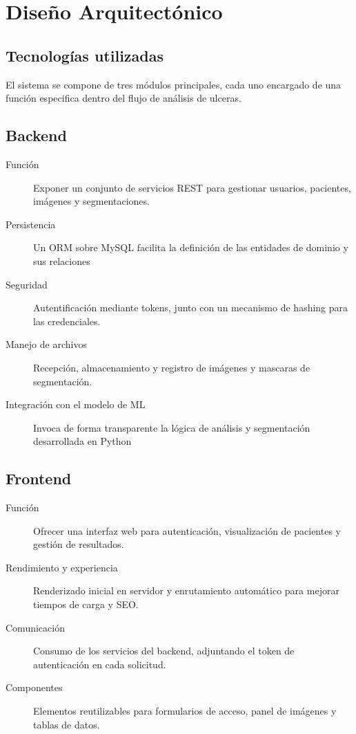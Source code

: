 \section{Diseño Arquitectónico}
\label{sc:DA}

\subsection{Tecnologías utilizadas}
\label{ssc:tech}

El sistema se compone de tres módulos principales, cada uno encargado de una función especifica dentro del flujo de análisis de ulceras.
\subsection{Backend}
\begin{description}
    \item[Función] Exponer un conjunto de servicios REST para gestionar usuarios, pacientes, imágenes y segmentaciones. 
    \item[Persistencia] Un ORM sobre MySQL facilita la definición de las entidades de dominio y sus relaciones 
    \item[Seguridad] Autentificación mediante tokens, junto con un mecanismo de hashing para las credenciales.
    \item[Manejo de archivos] Recepción, almacenamiento y registro de imágenes y mascaras de segmentación.
    \item[Integración con el modelo de ML] Invoca de forma transparente la lógica de análisis y segmentación desarrollada en Python   
\end{description}

\subsection{Frontend}
\begin{description}
\item[Función] Ofrecer una interfaz web para autenticación, visualización de pacientes y gestión de resultados.
\item[Rendimiento y experiencia] Renderizado inicial en servidor y enrutamiento automático para mejorar tiempos de carga y SEO.
\item[Comunicación] Consumo de los servicios del backend, adjuntando el token de autenticación en cada solicitud.
\item[Componentes] Elementos reutilizables para formularios de acceso, panel de imágenes y tablas de datos.
\end{description}

